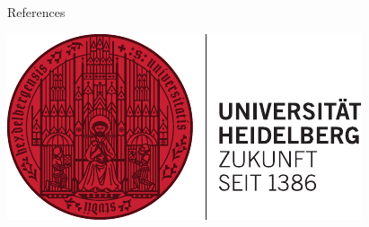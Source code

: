 \documentclass[final]{beamer}
\newlength{\onecolwid}
\begin{document}
\begin{frame}[t]
\begin{columns}[t]
\begin{column}{\onecolwid}
\begin{block}{References}

\small{
\vspace{0.75in}}

\end{block}


%



\begin{flushright}
\includegraphics[width=0.5\linewidth]{logo_hd.pdf}
\end{flushright}


\end{column} %

\end{columns} %

\end{frame} %
\end{document}
